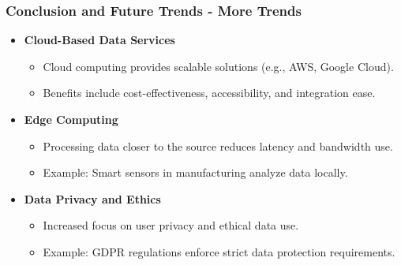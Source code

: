 \documentclass[aspectratio=169]{beamer}
\begin{document}
\begin{frame}[fragile]
    \frametitle{Conclusion and Future Trends - More Trends}
    \begin{itemize}
        \item \textbf{Cloud-Based Data Services}
            \begin{itemize}
                \item Cloud computing provides scalable solutions (e.g., AWS, Google Cloud).
                \item Benefits include cost-effectiveness, accessibility, and integration ease.
            \end{itemize}
        
        \item \textbf{Edge Computing}
            \begin{itemize}
                \item Processing data closer to the source reduces latency and bandwidth use.
                \item Example: Smart sensors in manufacturing analyze data locally.
            \end{itemize}

        \item \textbf{Data Privacy and Ethics}
            \begin{itemize}
                \item Increased focus on user privacy and ethical data use.
                \item Example: GDPR regulations enforce strict data protection requirements.
            \end{itemize}
    \end{itemize}
\end{frame}
\end{document}
